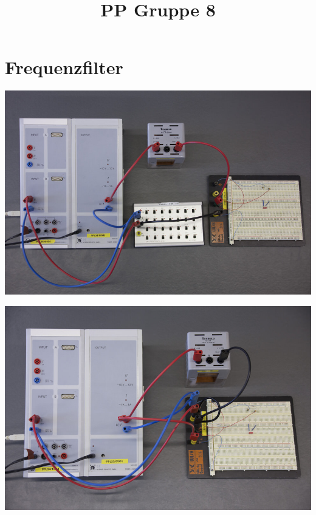 \documentclass[compress,11pt]{beamer}
\title{PP Gruppe 8}
\begin{document}
\frame[c]{\titlepage}
\begin{frame}
\tableofcontents
\end{frame}


\section{Frequenzfilter}
\begin{frame}
	\includegraphics[width=\textwidth]{images/1/durchlassfilter}
\end{frame}

\begin{frame}
	\includegraphics[width=\textwidth]{images/1/sperrfilter}
\end{frame}
\end{document}
